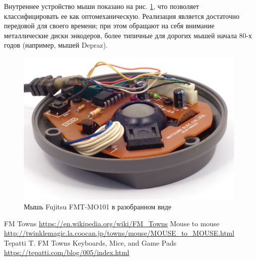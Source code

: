 \documentclass[11pt, a4paper]{article}
\begin{document}
Внутреннее устройство мыши показано на рис. \ref{fig:FMT1Inside}, что позволяет классифицировать  ее как оптомеханическую. Реализация является достаточно передовой для своего времени; при этом обращают на себя внимание металлические диски энкодеров, более типичные для дорогих мышей начала 80-х годов (например, мышей Depraz).

\begin{figure}[h]
    \centering
    \includegraphics[scale=0.8]{1989_fujitsu_fmt_mo101_mouse/inside_30.jpg}
    \caption{Мышь Fujitsu FMT-MO101 в разобранном виде}
    \label{fig:FMT1Inside}
\end{figure}

\begin{thebibliography}{9}
     FM Towns \url{https://en.wikipedia.org/wiki/FM_Towns}
     Mouse to mouse \url{http://twinklemagic.la.coocan.jp/towns/mouse/MOUSE_to_MOUSE.html} 
     Tepatti T. FM Towns Keyboards, Mice, and Game Pads \url{https://tepatti.com/blog/005/index.html}
\end{thebibliography}
\end{document}
